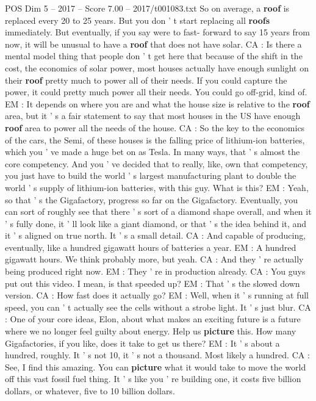 \begin{textsample}{POS Dim 5 – 2017 – Score 7.00 – 2017/t001083.txt}
So on average, a \textbf{roof} is replaced every 20 to 25 years.
But you don ' t start replacing all \textbf{roofs} immediately.
But eventually, if you say were to fast- forward to say 15 years from now, it will be unusual to have a \textbf{roof} that does not have solar.
CA : Is there a mental model thing that people don ' t get here that because of the shift in the cost, the economics of solar power, most houses actually have enough sunlight on their \textbf{roof} pretty much to power all of their needs.
If you could capture the power, it could pretty much power all their needs.
You could go off-grid, kind of.
EM : It depends on where you are and what the house size is relative to the \textbf{roof} area, but it ' s a fair statement to say that most houses in the US have enough \textbf{roof} area to power all the needs of the house.
CA : So the key to the economics of the cars, the Semi, of these houses is the falling price of lithium-ion batteries, which you ' ve made a huge bet on as Tesla.
In many ways, that ' s almost the core competency.
And you ' ve decided that to really, like, own that competency, you just have to build the world ' s largest manufacturing plant to double the world ' s supply of lithium-ion batteries, with this guy.
What is this?
EM : Yeah, so that ' s the Gigafactory, progress so far on the Gigafactory.
Eventually, you can sort of roughly see that there ' s sort of a diamond shape overall, and when it ' s fully done, it ' ll look like a giant diamond, or that ' s the idea behind it, and it ' s aligned on true north.
It ' s a small detail.
CA : And capable of producing, eventually, like a hundred gigawatt hours of batteries a year.
EM : A hundred gigawatt hours.
We think probably more, but yeah.
CA : And they ' re actually being produced right now.
EM : They ' re in production already.
CA : You guys put out this video.
I mean, is that speeded up?
EM : That ' s the slowed down version.
CA : How fast does it actually go?
EM : Well, when it ' s running at full speed, you can ' t actually see the cells without a strobe light.
It ' s just blur.
CA : One of your core ideas, Elon, about what makes an exciting future is a future where we no longer feel guilty about energy.
Help us \textbf{picture} this.
How many Gigafactories, if you like, does it take to get us there?
EM : It ' s about a hundred, roughly.
It ' s not 10, it ' s not a thousand.
Most likely a hundred.
CA : See, I find this amazing.
You can \textbf{picture} what it would take to move the world off this vast fossil fuel thing.
It ' s like you ' re building one, it costs five billion dollars, or whatever, five to 10 billion dollars.

\end{textsample}
